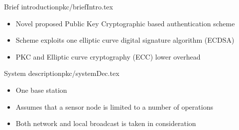 
\begin{notedFrame}{Brief introduction}{pkc/briefIntro.tex}
    \begin{itemize}
        \item Novel proposed Public Key Cryptographic based authentication scheme
        \item Scheme exploits one elliptic curve digital signature algorithm (ECDSA)
        \item PKC and Elliptic curve cryptography (ECC) lower overhead
    \end{itemize}
\end{notedFrame}


\begin{notedFrame}{System description}{pkc/systemDec.tex}
    \begin{itemize}
        \item One base station
        \item Assumes that a sensor node is limited to a number of operations
        \item Both network and local broadcast is taken in consideration
    \end{itemize}
\end{notedFrame}


